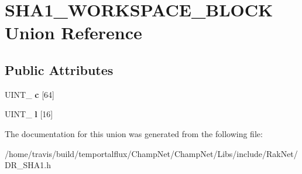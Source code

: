 \hypertarget{union_s_h_a1___w_o_r_k_s_p_a_c_e___b_l_o_c_k}{\section{S\-H\-A1\-\_\-\-W\-O\-R\-K\-S\-P\-A\-C\-E\-\_\-\-B\-L\-O\-C\-K Union Reference}
\label{union_s_h_a1___w_o_r_k_s_p_a_c_e___b_l_o_c_k}
}
\subsection*{Public Attributes}
\begin{DoxyCompactItemize}
\item 
\hypertarget{union_s_h_a1___w_o_r_k_s_p_a_c_e___b_l_o_c_k_aa48d6535109d06cf9c86d229406695b5}{U\-I\-N\-T\-\_ {\bfseries c} \mbox{[}64\mbox{]}}\label{union_s_h_a1___w_o_r_k_s_p_a_c_e___b_l_o_c_k_aa48d6535109d06cf9c86d229406695b5}

\item 
\hypertarget{union_s_h_a1___w_o_r_k_s_p_a_c_e___b_l_o_c_k_a29c830f54bb0e22acebac3fe5ad64b23}{U\-I\-N\-T\-\_ {\bfseries l} \mbox{[}16\mbox{]}}\label{union_s_h_a1___w_o_r_k_s_p_a_c_e___b_l_o_c_k_a29c830f54bb0e22acebac3fe5ad64b23}

\end{DoxyCompactItemize}


The documentation for this union was generated from the following file\-:\begin{DoxyCompactItemize}
\item 
/home/travis/build/temportalflux/\-Champ\-Net/\-Champ\-Net/\-Libs/include/\-Rak\-Net/D\-R\-\_\-\-S\-H\-A1.\-h\end{DoxyCompactItemize}
